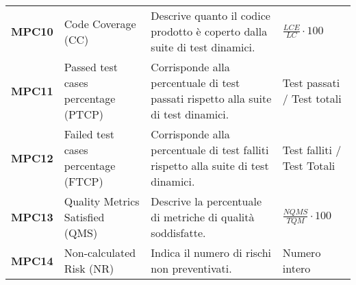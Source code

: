 \begin{longtable}{C{1.5cm} C{4.5cm} C{5cm} C{4.5cm}}
		\textbf{MPC10} &
		Code Coverage (CC) &
		Descrive quanto il codice prodotto è coperto dalla suite di test dinamici. & $\frac{LCE}{LC}\cdot 100$ \\ 
		
		\textbf{MPC11} &
		Passed test cases percentage (PTCP) &
		Corrisponde alla percentuale di test passati rispetto alla suite di test dinamici. &
		Test passati / Test totali \\ 
		
		\textbf{MPC12} &
		Failed test cases percentage (FTCP) &
		Corrisponde alla percentuale di test falliti rispetto alla suite di test dinamici. &
		Test falliti / Test Totali \\ 
		
		\textbf{MPC13} &
		Quality Metrics Satisfied (QMS) &
		Descrive la percentuale di metriche di qualità soddisfatte. &
		$\frac{NQMS}{TQM} \cdot 100$ \\
		
		\textbf{MPC14} &
		Non-calculated Risk (NR) &
		Indica il numero di rischi non preventivati. &
		Numero intero 
\end{longtable}


